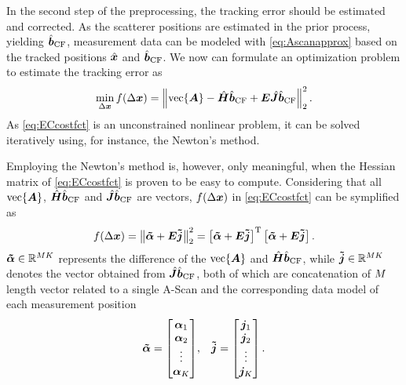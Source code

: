 In the second step of the preprocessing, the tracking error should be estimated and corrected. As the scatterer positions are estimated in the prior process, yielding $\hat{\bm{b}}_{\operatorname{CF}}$, measurement data can be modeled with \eqref{eq:Ascanapprox} based on the tracked positions $\hat{\bm{x}}$ and $\hat{\bm{b}}_{\operatorname{CF}}$. We now can formulate an optimization problem to estimate the tracking error as
\begin{equation} \label{eq:ECcostfct}
	\min_{\xxdelta} f (\xxdelta) = 
	\norm{
		\vectorize{\Ascan} - \SAFThat \defecthat_{\CF} + \Error \SAFTdothat \defecthat_{\CF} 
	}_{2}^{2}.
\end{equation} 
As \eqref{eq:ECcostfct} is an unconstrained nonlinear problem, it can be solved iteratively using, for instance, the Newton's method. \par 

Employing the Newton's method is, however, only meaningful, when the Hessian matrix of \eqref{eq:ECcostfct} is proven to be easy to compute. Considering that all $\operatorname{vec} \{ \bm{A} \}$, $\hat{\bm{H}} \hat{\bm{b}}_{\operatorname{CF}}$ and $\hat{\bm{J}} \hat{\bm{b}}_{\operatorname{CF}}$ are vectors, $f (\Delta \bm{x})$ in \eqref{eq:ECcostfct} can be symplified as 
\begin{equation}
	f (\Delta \bm{x}) 
	= \left\lVert\bm{\tilde{\alpha}} + \bm{E} \bm{\tilde{j}}\right\rVert_{2}^{2}
	= \left[ \bm{\tilde{\alpha}} + \bm{E} \bm{\tilde{j}} \right]^{\operatorname{T}} \left[ \bm{\tilde{\alpha}} + \bm{E} \bm{\tilde{j}} \right].
\end{equation}
$\bm{\tilde{\alpha}} \in {\mathbb{R}}^{M K}$ represents the difference of the $\operatorname{vec} \{ \bm{A} \}$ and $\hat{\bm{H}} \hat{\bm{b}}_{\operatorname{CF}}$, while $\bm{\tilde{j}} \in {\mathbb{R}}^{M K}$ denotes the vector obtained from $\hat{\bm{J}} \hat{\bm{b}}_{\operatorname{CF}}$, both of which are concatenation of $M$ length vector related to a single A-Scan and the corresponding data model of each measurement position
\begin{eqnarray}
	\bm{\tilde{\alpha}} = \begin{bmatrix} \bm{\alpha}_{1} \\ \bm{\alpha}_{2} \\ \vdots \\ \bm{\alpha}_{K}	\end{bmatrix} &
	, &
	\bm{\tilde{j}} = \begin{bmatrix} \bm{j}_{1} \\ \bm{j}_{2} \\ \vdots \\ \bm{j}_{K}	\end{bmatrix}.
\end{eqnarray}

